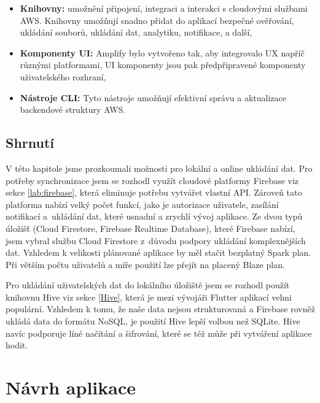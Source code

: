 \documentclass[czech, bc, kiv, he, iso690numb]{fasthesis}
\begin{document}
\begin{itemize}
    \item \textbf{Knihovny:} umožnění připojení, integraci a interakci s cloudovými službami \gls{AWS}. Knihovny umožňují snadno přidat do aplikací bezpečné ověřování, ukládání souborů, ukládání dat, analytiku, notifikace, a další,
    \item \textbf{Komponenty \gls{UI}:} Amplify bylo vytvořeno tak, aby integrovalo \gls{UX} napříč různými platformami, \gls{UI} komponenty jsou pak předpřipravené komponenty uživatelského rozhraní,
    \item \textbf{Nástroje \gls{CLI}:} Tyto nástroje umožňují efektivní správu a aktualizace backendové struktury \gls{AWS}.
\end{itemize}

\section{Shrnutí}

V této kapitole jsme prozkoumali možnosti pro lokální a online ukládání dat. Pro potřeby synchronizace jsem se rozhodl využít cloudové platformy Firebase viz sekce \ref{lab:firebase}, která eliminuje potřebu vytvářet vlastní \gls{API}. Zároveň tato platforma nabízí velký počet funkcí, jako je autorizace uživatele, zasílání notifikací a~ukládání dat, které usnadní a zrychlí vývoj aplikace. Ze dvou typů úložišť (Cloud Firestore, Firebase Realtime Database), které Firebase nabízí, jsem vybral službu Cloud Firestore z~důvodu podpory ukládání komplexnějších dat. Vzhledem k velikosti plánované aplikace by měl stačit bezplatný Spark plan. Při větším počtu uživatelů a míře použití lze přejít na placený Blaze plan.

Pro ukládání uživatelských dat do lokálního úložiště jsem se rozhodl použít knihovnu Hive viz sekce \ref{Hive}, která je mezi vývojáři Flutter aplikací velmi populární. Vzhledem k tomu, že naše data nejsou strukturovaná a Firebase rovněž ukládá data do formátu \gls{NoSQL}, je použití Hive lepší volbou než SQLite. Hive navíc podporuje líné načítání a šifrování, které se též může při vytváření aplikace hodit.


%
%
%
%

\chapter{Návrh aplikace} \label{chapter:navrh}
\end{document}
